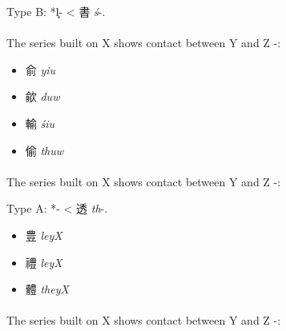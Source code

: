 Type B: *l̥- < 書  \emph{ś}-.

\paragraph{}
The series built on X 
shows contact between Y and Z -:

\begin{itemize}\item
{\Large{俞}}  \emph{yiu} %

\item
{\Large{歈}}  \emph{duw} %

\item
{\Large{輸}}  \emph{śiu} %

\item
{\Large{偷}}  \emph{thuw} %
\end{itemize}



\paragraph{}
The series built on X 
shows contact between Y and Z -:

Type A: *{}-
< 透  \emph{th}-.

\begin{itemize}\item
{\Large{豊}}  \emph{leyX} %

\item
{\Large{禮}}  \emph{leyX} %

\item
{\Large{體}}  \emph{theyX} %
\end{itemize}



\paragraph{}
The series built on X 
shows contact between Y and Z -:

